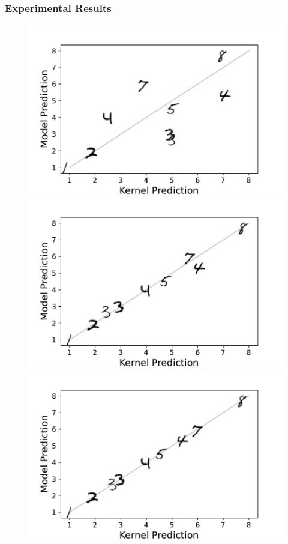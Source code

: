 \begin{frame}
\frametitle{Experimental Results}
\begin{figure}[!h]
    \centering
\includegraphics[width=0.45\linewidth]{c4_figures/mnist_model_kernel_compare_1_step.pdf}
    \vspace{-9mm}
\includegraphics[width=0.45\linewidth]{c4_figures/mnist_model_kernel_compare_10_steps.pdf}
    \vspace{-9mm}
\includegraphics[width=0.45\linewidth]{c4_figures/mnist_model_kernel_compare_200_steps.pdf}
  \end{figure}
  \end{frame}

